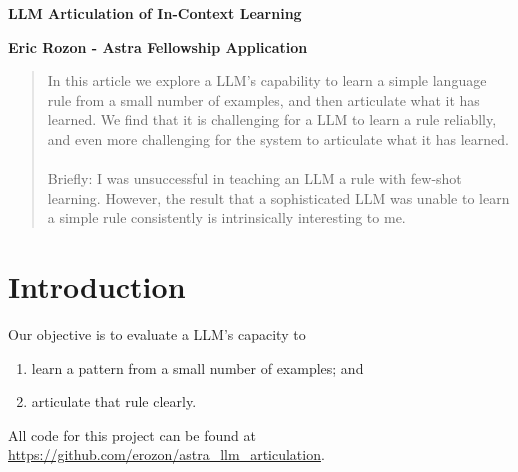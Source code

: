 \documentclass[titlepage, hidelinks, 12pt]{article}
\theoremstyle{plain}
\theoremstyle{remark}
\theoremstyle{definition}
\begin{document}
\begin{singlespace}
\begin{titlepage}
   \begin{center}
       \vspace*{1cm}
\Huge
       \textbf{LLM Articulation of In-Context Learning} \\
\Large
       \vspace{0.5cm}
      
            
       \vspace{4.1cm}
       \vspace*{\fill}
       \textbf{Eric Rozon - Astra Fellowship Application  } 

            
            
   \end{center}
\end{titlepage}




\begin{abstract}
    In this article we explore a LLM's capability to learn a simple language rule from a small number
    of examples, and then articulate what it has learned. We find that it is challenging for a LLM to
    learn a rule reliablly, and even more challenging for the system to articulate what it has learned. 
    \\ \\
    Briefly: I was unsuccessful in teaching an LLM a rule with few-shot learning. However, the result
    that a sophisticated LLM was unable to learn a simple rule consistently is intrinsically interesting to me. 


\end{abstract}



\newpage

%
\end{singlespace}

\linenumbers
\section{Introduction}\label{sec:introduction}
Our objective is to evaluate a LLM's capacity to
\begin{enumerate}
    \item learn a pattern from a small number of examples; and
    \item articulate that rule clearly.
\end{enumerate}
All code for this project can be found at \url{https://github.com/erozon/astra_llm_articulation}. 
\end{document}
